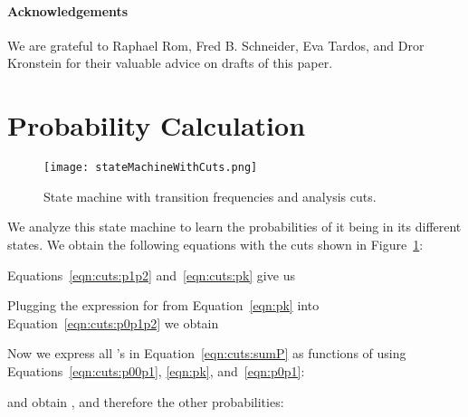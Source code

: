 \documentclass[letterpaper]{llncs}
\begin{document}
\paragraph{Acknowledgements} 
We are grateful to Raphael Rom, Fred B. Schneider, Eva Tardos, and Dror Kronstein for their valuable advice on drafts of this paper.



\clearpage

 
 



\clearpage

\appendix

    \section{Probability Calculation} \label{app:probs} 

\begin{figure}[!b] 
\centering
\texttt{[image: stateMachineWithCuts.png]}
\caption{ 
State machine with transition frequencies and analysis cuts. 
} 
\label{fig:stateMachineWithCuts} 
\end{figure}

We analyze this state machine to learn the probabilities of it being in its different states. We obtain the following equations with the cuts shown in Figure~\ref{fig:stateMachineWithCuts}: 
 

Equations~\ref{eqn:cuts:p1p2} and~\ref{eqn:cuts:pk} give us 
 

Plugging the expression for  from Equation~\ref{eqn:pk} into Equation~\ref{eqn:cuts:p0p1p2} we obtain 
 

Now we express all 's in Equation~\ref{eqn:cuts:sumP} as functions of  using Equations~\ref{eqn:cuts:p00p1}, \ref{eqn:pk}, and~\ref{eqn:p0p1}: 
 
and obtain , and therefore the other probabilities: 
 
\end{document}
